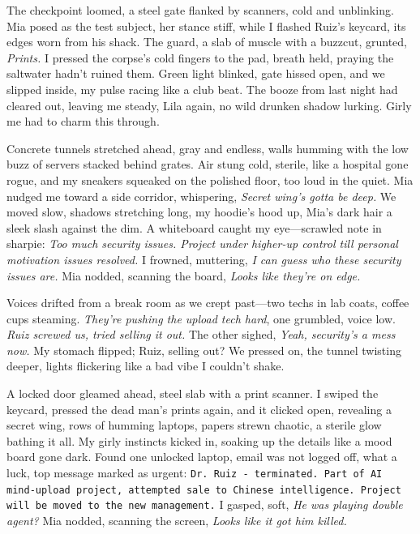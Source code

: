\documentclass[12pt,oneside]{book}
\newcommand{\note}[1]{\texttt{#1}}
\begin{document}
The checkpoint loomed, a steel gate flanked by scanners, cold and unblinking. Mia posed as the test subject, her stance stiff, while I flashed Ruiz’s keycard, its edges worn from his shack. The guard, a slab of muscle with a buzzcut, grunted, \textit{Prints.} I pressed the corpse’s cold fingers to the pad, breath held, praying the saltwater hadn’t ruined them. Green light blinked, gate hissed open, and we slipped inside, my pulse racing like a club beat. The booze from last night had cleared out, leaving me steady, Lila again, no wild drunken shadow lurking. Girly me had to charm this through.

Concrete tunnels stretched ahead, gray and endless, walls humming with the low buzz of servers stacked behind grates. Air stung cold, sterile, like a hospital gone rogue, and my sneakers squeaked on the polished floor, too loud in the quiet. Mia nudged me toward a side corridor, whispering, \textit{Secret wing’s gotta be deep.} We moved slow, shadows stretching long, my hoodie’s hood up, Mia’s dark hair a sleek slash against the dim. A whiteboard caught my eye—scrawled note in sharpie: \textit{Too much security issues. Project under higher-up control till personal motivation issues resolved.} I frowned, muttering, \textit{I can guess who these security issues are.} Mia nodded, scanning the board, \textit{Looks like they’re on edge.}

Voices drifted from a break room as we crept past—two techs in lab coats, coffee cups steaming. \textit{They’re pushing the upload tech hard}, one grumbled, voice low. \textit{Ruiz screwed us, tried selling it out.} The other sighed, \textit{Yeah, security’s a mess now.} My stomach flipped; Ruiz, selling out? We pressed on, the tunnel twisting deeper, lights flickering like a bad vibe I couldn’t shake.

A locked door gleamed ahead, steel slab with a print scanner. I swiped the keycard, pressed the dead man’s prints again, and it clicked open, revealing a secret wing, rows of humming laptops, papers strewn chaotic, a sterile glow bathing it all. My girly instincts kicked in, soaking up the details like a mood board gone dark. Found one unlocked laptop, email was not logged off, what a luck, top message marked as urgent: \note{Dr. Ruiz - terminated. Part of AI mind-upload project, attempted sale to Chinese intelligence. Project will be moved to the new management.} I gasped, soft, \textit{He was playing double agent?} Mia nodded, scanning the screen, \textit{Looks like it got him killed.}
\end{document}
